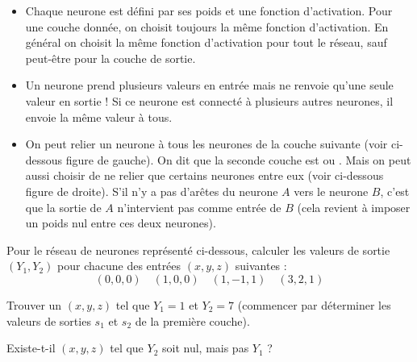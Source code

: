 \documentclass[11pt,class=report,crop=false]{standalone}
\begin{document}
\begin{remarque*}
\sauteligne
\begin{itemize}
  \item Chaque neurone est défini par ses poids et une fonction d'activation. Pour une couche donnée, on choisit toujours la même fonction d'activation. En général on choisit la même fonction d'activation pour tout le réseau, sauf peut-être pour la couche de sortie.

  \item Un neurone prend plusieurs valeurs en entrée mais ne renvoie qu'une seule valeur en sortie ! Si ce neurone est connecté à plusieurs autres neurones, il envoie la même valeur à tous.
  
  
  \item On peut relier un neurone à tous les neurones de la couche suivante (voir ci-dessous figure de gauche). On dit que la seconde couche  est  ou . Mais on peut aussi choisir de ne relier que certains neurones entre eux (voir ci-dessous figure de droite). S'il n'y a pas d'arêtes du neurone $A$ vers le neurone $B$, c'est que la sortie de $A$ n'intervient pas comme entrée de $B$ (cela revient à imposer un poids nul entre ces deux neurones).
  
 
  
  
\end{itemize}
\end{remarque*}  
  
\begin{exercicecours}
Pour le réseau de neurones représenté ci-dessous, calculer les valeurs de sortie $(Y_1,Y_2)$ pour chacune des entrées $(x,y,z)$ suivantes :
$$(0,0,0) \quad (1,0,0) \quad (1,-1,1) \quad (3,2,1)$$




Trouver un $(x,y,z)$ tel que $Y_1=1$ et $Y_2=7$ (commencer par déterminer les valeurs de sorties $s_1$ et $s_2$ de la première couche).

Existe-t-il $(x,y,z)$ tel que $Y_2$ soit nul, mais pas $Y_1$ ?
\end{exercicecours}

\end{document}
